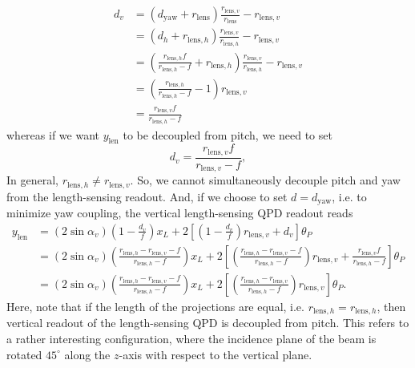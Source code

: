 \begin{equation}
	\begin{split}
	d_v &= \left(d_\mathrm{yaw}+r_\mathrm{lens}\right)\frac{r_{\mathrm{lens},v}}{r_\mathrm{lens}} - r_{\mathrm{lens},v}\\
	&= \left(d_h+r_{\mathrm{lens},h}\right)\frac{r_{\mathrm{lens},v}}{r_{\mathrm{lens},h}}-r_{\mathrm{lens},v}\\
	&= \left(\frac{r_{\mathrm{lens},h}f}{r_{\mathrm{lens},h}-f}+r_{\mathrm{lens},h}\right)\frac{r_{\mathrm{lens},v}}{r_{\mathrm{lens},h}}-r_{\mathrm{lens},v}\\
	&=\left(\frac{r_{\mathrm{lens},h}}{r_{\mathrm{lens},h}-f}-1\right)r_{\mathrm{lens},v}\\
	&=\frac{r_{\mathrm{lens},v}f}{r_{\mathrm{lens},h}-f}
	\end{split}
\end{equation}
whereas if we want $y_\mathrm{len}$ to be decoupled from pitch, we need to set
\begin{equation}
	d_v = \frac{r_{\mathrm{lens},v}f}{r_{\mathrm{lens},v}-f},
\end{equation}
In general, $r_{\mathrm{lens},h}\neq r_{\mathrm{lens},v}$.
So, we cannot simultaneously decouple pitch and yaw from the length-sensing readout.
And, if we choose to set $d=d_\mathrm{yaw}$, i.e. to minimize yaw coupling, the vertical length-sensing QPD readout reads
\begin{equation}
	\begin{split}
	y_\mathrm{len} &= \left(2\sin\alpha_v\right)\left(1-\frac{d_v}{f}\right)x_L + 2\left[\left(1-\frac{d_v}{f}\right)r_{\mathrm{lens},v}+d_v\right]\theta_P\\
	&= \left(2\sin\alpha_v\right)\left(\frac{r_{\mathrm{lens},h}-r_{\mathrm{lens},v}-f}{r_{\mathrm{lens},h}-f}\right)x_L + 2\left[\left(\frac{r_{\mathrm{lens},h}-r_{\mathrm{lens},v}-f}{r_{\mathrm{lens},h}-f}\right)r_{\mathrm{lens},v} + \frac{r_{\mathrm{lens},v}f}{r_{\mathrm{lens},h}-f}\right] \theta_P\\
	&=\left(2\sin\alpha_v\right)\left(\frac{r_{\mathrm{lens},h}-r_{\mathrm{lens},v}-f}{r_{\mathrm{lens},h}-f}\right)x_L
	+ 2\left[\left(\frac{r_{\mathrm{lens},h}-r_{\mathrm{lens},v}}{r_{\mathrm{lens},h}-f}\right)r_{\mathrm{lens},v}\right] \theta_P.
	\end{split}
	\label{eqn:y_len}
\end{equation}
Here, note that if the length of the projections are equal, i.e. $r_{\mathrm{lens},h}=r_{\mathrm{lens},h}$, then vertical readout of the length-sensing QPD is decoupled from pitch.
This refers to a rather interesting configuration, where the incidence plane of the beam is rotated $45^\circ$ along the $z$-axis with respect to the vertical plane.

